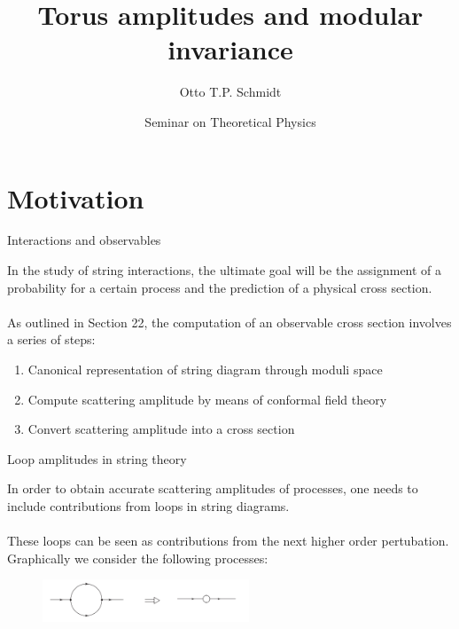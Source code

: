 \documentclass[11pt,aspectratio=169]{beamer}
\title{Torus amplitudes and modular invariance}
\date[16.5.2022]{Seminar on Theoretical Physics}
\author{Otto T.P. Schmidt}
\institute[Department of Physics]{}
\begin{document}

\titleframe



\tocframe

\section{Motivation}

\begin{frame}[fragile]{Interactions and observables}

	In the study of string interactions, the ultimate goal will be the assignment of a probability for a certain process and the prediction of a physical cross section.
	\\~\\
	As outlined in Section 22, the computation of an observable cross section involves a series of steps:
	\begin{enumerate}
		\item Canonical representation of string diagram through moduli space
		\item Compute scattering amplitude by means of conformal field theory
		\item Convert scattering amplitude into a cross section
	\end{enumerate}
	
	
		




\end{frame}

\begin{frame}[fragile]{Loop amplitudes in string theory}
	
	In order to obtain accurate scattering amplitudes of processes,
	one needs to include contributions from loops in string diagrams. 
	\\~\\
	These loops can be seen as contributions
	from the next higher order pertubation. 
	Graphically we consider the following processes:
	\begin{figure}[htbp]
		\centering
		\includegraphics[width = 0.55\textwidth]{elements/Feynman loop}
	\end{figure}


\end{frame}
\end{document}
